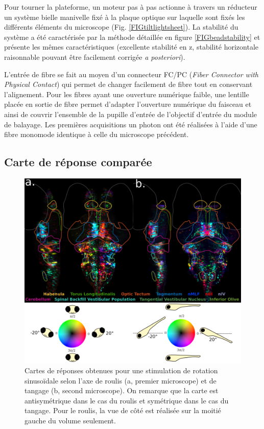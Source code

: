 Pour tourner la plateforme, un moteur pas à pas actionne à travers un réducteur un système bielle manivelle fixé à la plaque optique sur laquelle sont fixés les différents éléments du microscope (Fig. \ref{FIGtiltlightsheet}). La stabilité du système a été caractérisée par la méthode détaillée en figure \ref{FIGbeadstability} et présente les mêmes caractéristiques (excellente stabilité en z, stabilité horizontale raisonnable pouvant être facilement corrigée \emph{a posteriori}).

L'entrée de fibre se fait au moyen d'un connecteur FC/PC (\emph{Fiber Connector with Physical Contact}) qui permet de changer facilement de fibre tout en conservant l'alignement. Pour les fibres ayant une ouverture numérique faible, une lentille placée en sortie de fibre permet d'adapter l'ouverture numérique du faisceau et ainsi de couvrir l'ensemble de la pupille d'entrée de l'objectif d'entrée du module de balayage. Les premières acquisitions un photon ont été réalisées à l'aide d'une fibre monomode identique à celle du microscope précédent.

\subsection{Carte de réponse comparée}

\begin{figure}
\centering
\includegraphics[width=\textwidth]{./files/tilt_roll.svg.png}
\caption{Cartes de réponses obtenues pour une stimulation de rotation sinusoïdale selon l'axe de roulis (a, premier microscope) et de tangage (b, second microscope). On remarque que la carte est antisymétrique dans le cas du roulis et symétrique dans le cas du tangage.
Pour le roulis, la vue de côté est réalisée sur la moitié gauche du volume seulement.
\label{FIGtiltroll}}
\end{figure}

